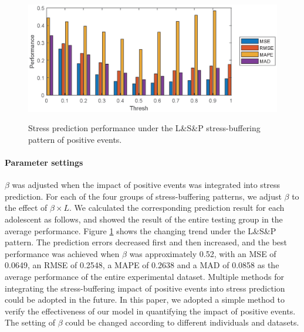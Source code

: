 \begin{figure}
\centering
\caption{\small{Stress prediction performance under the L\&S\&P stress-buffering pattern of positive events.}}
\includegraphics[width=\linewidth]{figs/thresh.eps}
\label{fig:thresh}
\end{figure}

\paragraph{Parameter settings}
$\beta$ was adjusted when the impact of positive events was integrated into stress prediction.
For each of the four groups of stress-buffering patterns,
we adjust $\beta$ to the effect of $\beta \times L$.
We calculated the corresponding prediction result for each adolescent as follows,
and showed the result of the entire testing group in the average performance.
Figure \ref{fig:thresh} shows the changing trend under the L\&S\&P pattern.
The prediction errors decreased first and then increased,
and the best performance was achieved when $\beta$ was
approximately 0.52, with an MSE of 0.0649, an RMSE of 0.2548,
a MAPE of 0.2638 and a MAD of 0.0858 as the average performance of the entire experimental dataset.
Multiple methods for integrating the stress-buffering impact of positive events into stress prediction could be adopted in the future.
In this paper,
we adopted a simple method to verify the effectiveness of our model in quantifying the impact of positive events.
The setting of $\beta$ could be changed according to different individuals and datasets.
